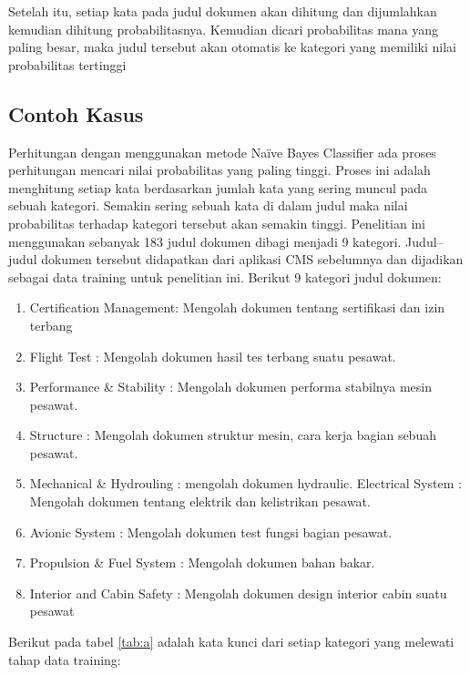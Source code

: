 \par Setelah itu, setiap kata pada judul dokumen akan dihitung dan dijumlahkan kemudian dihitung probabilitasnya. Kemudian dicari probabilitas mana yang paling besar, maka judul tersebut akan otomatis ke kategori yang memiliki nilai probabilitas tertinggi

\subsection{Contoh Kasus}
Perhitungan dengan menggunakan metode Naïve Bayes Classifier ada proses perhitungan mencari nilai probabilitas yang paling tinggi. Proses ini adalah menghitung setiap kata berdasarkan jumlah kata yang sering muncul pada sebuah kategori. Semakin sering sebuah kata di dalam judul maka nilai probabilitas terhadap kategori tersebut akan semakin tinggi. Penelitian ini menggunakan sebanyak 183 judul dokumen dibagi menjadi 9 kategori. Judul–judul dokumen tersebut didapatkan dari aplikasi CMS sebelumnya dan dijadikan sebagai data training untuk penelitian ini. Berikut 9 kategori judul dokumen:
    \begin{enumerate}
        \item 	Certification Management: Mengolah dokumen tentang sertifikasi dan izin terbang
    	\item Flight Test : Mengolah dokumen hasil tes terbang suatu pesawat.
	    \item Performance & Stability : Mengolah dokumen performa stabilnya mesin pesawat.
	    \item Structure : Mengolah dokumen struktur mesin, cara kerja bagian sebuah pesawat.
        \item Mechanical & Hydrouling : mengolah dokumen hydraulic.
    	\ITEM Electrical System : Mengolah dokumen tentang elektrik dan kelistrikan pesawat.
	    \item Avionic System : Mengolah dokumen test fungsi bagian pesawat.
	    \item Propulsion & Fuel System : Mengolah dokumen bahan bakar.
	    \item Interior and Cabin Safety : Mengolah dokumen design interior cabin suatu pesawat
    \end{enumerate}
    Berikut pada tabel \ref{tab:a} adalah kata kunci dari setiap kategori yang melewati tahap data training:
    \vspace{5 cm}
